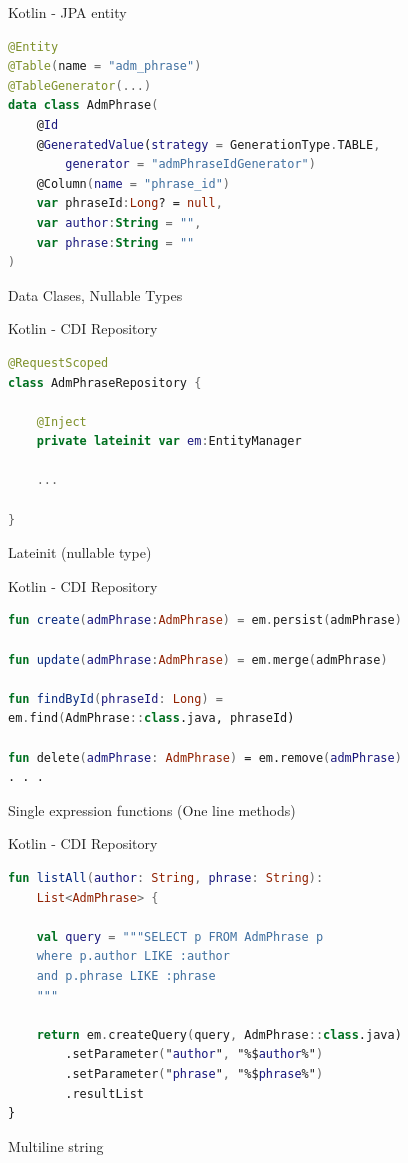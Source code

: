 \documentclass[aspectratio=169]{beamer}
\begin{document}
\begin{frame}[fragile]{Kotlin - JPA entity}
\begin{lstlisting}[language=Kotlin]
@Entity
@Table(name = "adm_phrase")
@TableGenerator(...)
data class AdmPhrase(
	@Id
	@GeneratedValue(strategy = GenerationType.TABLE,
		generator = "admPhraseIdGenerator")
	@Column(name = "phrase_id")
	var phraseId:Long? = null,
	var author:String = "",
	var phrase:String = ""
)
\end{lstlisting}
Data Clases, Nullable Types
\end{frame}

\begin{frame}[fragile]{Kotlin - CDI Repository}
\begin{lstlisting}[language=Kotlin]
@RequestScoped
class AdmPhraseRepository {

	@Inject
	private lateinit var em:EntityManager
	
	...

}
\end{lstlisting}
Lateinit (nullable type)
\end{frame}

\begin{frame}[fragile]{Kotlin - CDI Repository}
\begin{lstlisting}[language=Kotlin]
fun create(admPhrase:AdmPhrase) = em.persist(admPhrase)

fun update(admPhrase:AdmPhrase) = em.merge(admPhrase)

fun findById(phraseId: Long) =
em.find(AdmPhrase::class.java, phraseId)

fun delete(admPhrase: AdmPhrase) = em.remove(admPhrase)
. . .
\end{lstlisting}
Single expression functions (One line methods)
\end{frame}

\begin{frame}[fragile]{Kotlin - CDI Repository}
\begin{lstlisting}[language=Kotlin]
fun listAll(author: String, phrase: String):
	List<AdmPhrase> {
	
	val query = """SELECT p FROM AdmPhrase p
	where p.author LIKE :author
	and p.phrase LIKE :phrase
	"""
	
	return em.createQuery(query, AdmPhrase::class.java)
		.setParameter("author", "%$author%")
		.setParameter("phrase", "%$phrase%")
		.resultList
}
\end{lstlisting}
Multiline string
\end{frame}
\end{document}
